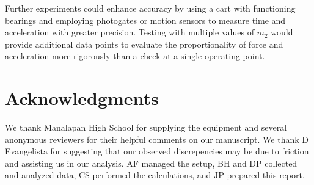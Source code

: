\documentclass[reprint,amsmath,amssymb,aps]{revtex4-2}
\begin{document}
Further experiments could enhance accuracy by using a cart with functioning bearings and employing photogates or motion sensors to measure time and acceleration with greater precision. Testing with multiple values of $m_2$ would provide additional data points to evaluate the proportionality of force and acceleration more rigorously than a check at a single operating point. 





\section{Acknowledgments}
We thank Manalapan High School for supplying the equipment and several anonymous reviewers for their helpful comments on our manuscript. We thank D Evangelista for suggesting that our observed discrepencies may be due to friction and assisting us in our analysis. AF managed the setup, BH and DP collected and analyzed data, CS performed the calculations, and JP prepared this report.

%

\end{document}
